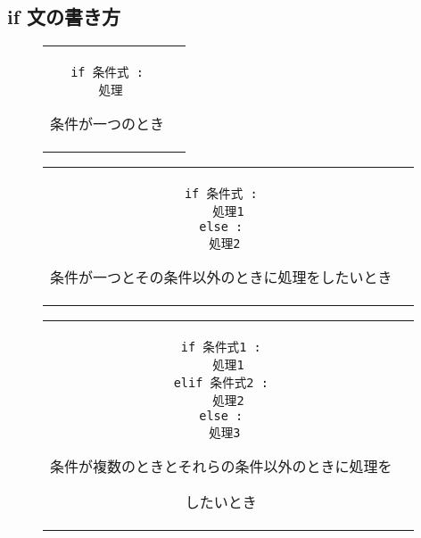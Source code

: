 \documentclass{jsarticle}
\begin{document}
\subsection{if 文の書き方} \vspace{-5mm}
\begin{figure}[h]
	\begin{tabular}{cc}
		\begin{minipage}[c]{.3\textwidth}
			\begin{lstlisting}[caption=if 文の基本構文-その1]
if 条件式 :
  処理 \end{lstlisting}
		\end{minipage} \hspace{10mm}
		\begin{minipage}[c]{.7\textwidth}
			条件が一つのとき
		\end{minipage}
	\end{tabular}
\end{figure}
\vspace{-5mm}
\begin{figure}[h]
	\begin{tabular}{cc}
		\begin{minipage}[c]{.3\textwidth}
			\begin{lstlisting}[caption=if 文の基本構文-その2]
if 条件式 :
  処理1
else :
  処理2 \end{lstlisting}
		\end{minipage} \hspace{10mm}
		\begin{minipage}[c]{.5\textwidth}
			条件が一つとその条件以外のときに処理をしたいとき
		\end{minipage}
	\end{tabular}
\end{figure}
\vspace{-5mm}
\begin{figure}[h]
	\begin{tabular}{cc}
		\begin{minipage}[c]{.3\textwidth}
			\begin{lstlisting}[caption=if 文の基本構文-その3]
if 条件式1 :
  処理1
elif 条件式2 :
  処理2
else :
  処理3 \end{lstlisting}
		\end{minipage} \hspace{10mm}
		\begin{minipage}[c]{.5\textwidth}
			条件が複数のときとそれらの条件以外のときに処理を \par したいとき
		\end{minipage}
	\end{tabular}
\end{figure}
\end{document}
